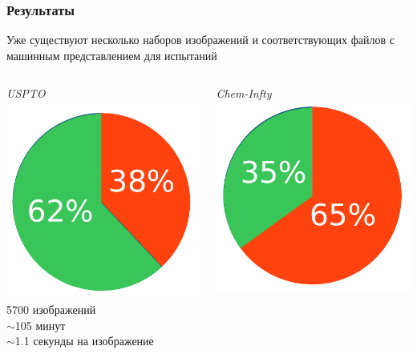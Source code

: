\begin{frame}
  \frametitle{Результаты}
  Уже существуют несколько наборов изображений и соответствующих файлов с машинным представлением для испытаний

  \begin{columns}
    \begin{column}{0.5\textwidth}
      \begin{center}\emph{USPTO \footnotemark} \\ \includegraphics[scale=0.4]{media/pie_chart1.pdf} \\ 5700 изображений \\
      $\sim$105 минут \\ $\sim$1.1 секунды на изображение \end{center}
    \end{column}
    \begin{column}{0.5\textwidth}
      \begin{center}\emph{Chem-Infty} \\ \includegraphics[scale=0.4]{media/pie_chart2.pdf} \\ 

\end{center}
\end{column}
\end{columns}
\end{frame}
